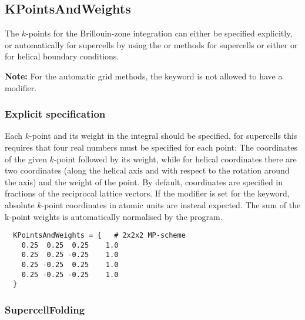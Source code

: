 \subsection{KPointsAndWeights}
\label{sec:dftbp.KPointsAndWeights}

The $k$-points for the Brillouin-zone integration can either be specified
explicitly, or automatically for supercells by using the 
or  methods for supercells or either  or
 for helical boundary conditions.

\textbf{ Note:} For the automatic grid methods, the 
keyword is not allowed to have a modifier.

\subsubsection{Explicit specification}

Each $k$-point and its weight in the integral should be specified, for
supercells this requires that four real numbers must be specified for
each point: The coordinates of the given $k$-point followed by its
weight, while for helical coordinates there are two coordinates (along
the helical axis and with respect to the rotation around the axis) and
the weight of the point. By default, coordinates are specified in
fractions of the reciprocal lattice vectors. If the modifier
 is set for the  keyword, absolute
$k$-point coordinates in atomic units are instead expected.  The sum
of the k-point weights is automatically normalised by the program.
\begin{verbatim}
  KPointsAndWeights = {   # 2x2x2 MP-scheme
    0.25  0.25  0.25    1.0
    0.25  0.25 -0.25    1.0
    0.25 -0.25  0.25    1.0
    0.25 -0.25 -0.25    1.0
  }
\end{verbatim}

\subsubsection{SupercellFolding\cb}
\label{sec:dftbp.SupercellFolding}

